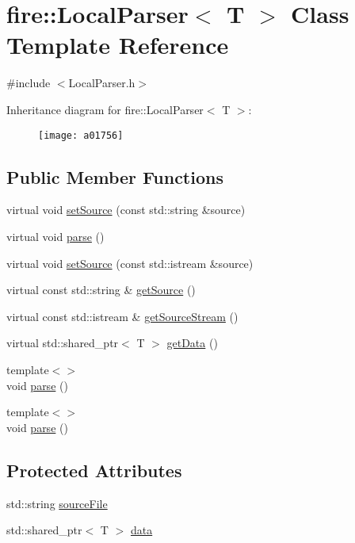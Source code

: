 \hypertarget{a01756}{}\section{fire\+:\+:Local\+Parser$<$ T $>$ Class Template Reference}
\label{a01756}


{\ttfamily \#include $<$Local\+Parser.\+h$>$}

Inheritance diagram for fire\+:\+:Local\+Parser$<$ T $>$\+:\begin{figure}[H]
\begin{center}
\leavevmode
\texttt{[image: a01756]}
\end{center}
\end{figure}
\subsection*{Public Member Functions}
\begin{DoxyCompactItemize}
\item 
virtual void \hyperlink{a01756_afcaec6429fdd6e5d53642a32c001ff73}{set\+Source} (const std\+::string \&source)
\item 
virtual void \hyperlink{a01756_abd8929aea06c2dda40256d2e58236650}{parse} ()
\item 
virtual void \hyperlink{a01756_aed4357541f2ff7d46f8846bd07bb3c42}{set\+Source} (const std\+::istream \&source)
\item 
virtual const std\+::string \& \hyperlink{a01756_aedb7fe10911182525a719963b9b56726}{get\+Source} ()
\item 
virtual const std\+::istream \& \hyperlink{a01756_a9bf19a3cc9ae8ac0e6e7a0e7f6212cdc}{get\+Source\+Stream} ()
\item 
virtual std\+::shared\+\_\+ptr$<$ T $>$ \hyperlink{a01756_ab9016cca8e5dca516bb57c6a8e76607a}{get\+Data} ()
\item 
{\footnotesize template$<$$>$ }\\void \hyperlink{a01756_a34fd9ffb0196c612c75b5288ed5e219b}{parse} ()
\item 
{\footnotesize template$<$$>$ }\\void \hyperlink{a01756_ae904e264fe16708b3e434adea59e1b88}{parse} ()
\end{DoxyCompactItemize}
\subsection*{Protected Attributes}
\begin{DoxyCompactItemize}
\item 
std\+::string \hyperlink{a01756_acf921ee916266efe70be5b24bec37fce}{source\+File}
\item 
std\+::shared\+\_\+ptr$<$ T $>$ \hyperlink{a01756_af8f722c7e35378c69e76e4275d384d86}{data}
\end{DoxyCompactItemize}


